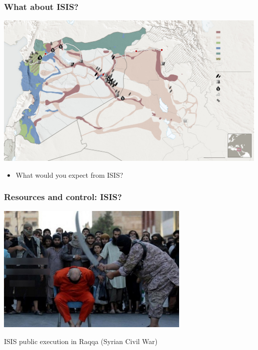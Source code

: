 \documentclass[aspectratio=43]{beamer}
\begin{document}
\begin{frame}
\frametitle{What about ISIS?}
\centering

\includegraphics[width = \textwidth]{img/isis_syria_oil}

\begin{itemize}
  \item What would you expect from ISIS?
\end{itemize}


\end{frame}

\begin{frame}
\frametitle{Resources and control: ISIS?}
\centering

\includegraphics[width = 0.7\textwidth]{img/isis-raqqa}

\vspace{15pt}

ISIS public execution in Raqqa (Syrian Civil War)

\end{frame}
\end{document}
